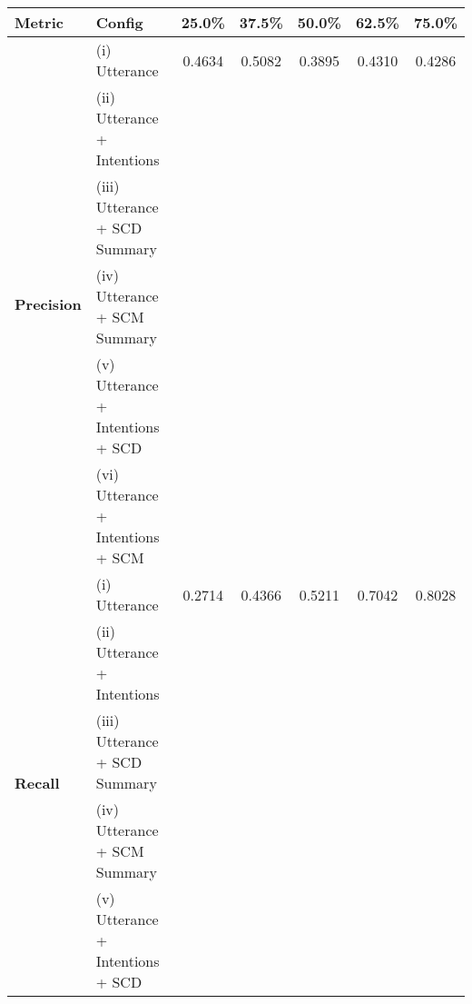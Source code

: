 \begin{table*}[ht]
\centering
\begin{tabular}{llccccc}
\hline
\textbf{Metric} & \textbf{Config} & \textbf{25.0\%} & \textbf{37.5\%} & \textbf{50.0\%} & \textbf{62.5\%} & \textbf{75.0\%} \\
\hline
\multirow{6}{*}{\textbf{Precision}} & (i) Utterance & 0.4634 & 0.5082 & 0.3895 & 0.4310 & 0.4286 \\
 & (ii) Utterance + Intentions & \cellcolor{green!25}{0.5400} & \cellcolor{red!25}{0.4933} & \cellcolor{red!25}{0.3491} & \cellcolor{red!25}{0.4000} & \cellcolor{red!25}{0.4085} \\
 & (iii) Utterance + SCD Summary & \cellcolor{green!25}{0.4915} & \cellcolor{red!25}{0.4800} & \cellcolor{green!25}{0.3945} & \cellcolor{red!25}{0.4077} & \cellcolor{red!25}{0.4130} \\
 & (iv) Utterance + SCM Summary & \cellcolor{red!25}{0.4630} & \cellcolor{red!25}{0.4524} & \cellcolor{red!25}{0.3894} & \cellcolor{red!25}{0.4113} & \cellcolor{red!25}{0.4222} \\
 & (v) Utterance + Intentions + SCD & \cellcolor{green!25}{0.5000} & \cellcolor{red!25}{0.4490} & \cellcolor{red!25}{0.3810} & \cellcolor{red!25}{0.4203} & \cellcolor{red!25}{0.4167} \\
 & (vi) Utterance + Intentions + SCM & \cellcolor{red!25}{0.4271} & \cellcolor{red!25}{0.4087} & \cellcolor{red!25}{0.3712} & \cellcolor{red!25}{0.3916} & \cellcolor{red!25}{0.4236} \\
\midrule
\multirow{6}{*}{\textbf{Recall}} & (i) Utterance & 0.2714 & 0.4366 & 0.5211 & 0.7042 & 0.8028 \\
 & (ii) Utterance + Intentions & \cellcolor{green!25}{0.3803} & \cellcolor{green!25}{0.5211} & \cellcolor{red!25}{0.5211} & \cellcolor{red!25}{0.7042} & \cellcolor{green!25}{0.8169} \\
 & (iii) Utterance + SCD Summary & \cellcolor{green!25}{0.4085} & \cellcolor{green!25}{0.5070} & \cellcolor{green!25}{0.6056} & \cellcolor{green!25}{0.7465} & \cellcolor{red!25}{0.8028} \\
 & (iv) Utterance + SCM Summary & \cellcolor{green!25}{0.3521} & \cellcolor{green!25}{0.5352} & \cellcolor{green!25}{0.6197} & \cellcolor{green!25}{0.7183} & \cellcolor{red!25}{0.8028} \\
 & (v) Utterance + Intentions + SCD & \cellcolor{green!25}{0.5352} & \cellcolor{green!25}{0.6197} & \cellcolor{green!25}{0.6761} & \cellcolor{green!25}{0.8169} & \cellcolor{green!25}{0.8451} \\

\end{tabular}
\end{table*}
